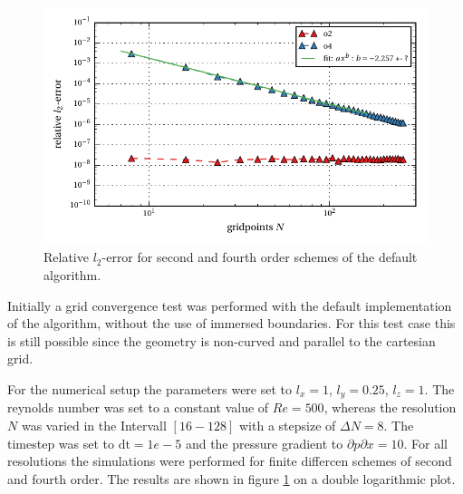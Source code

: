 \begin{figure}[!bp]
    \centering
    \includegraphics{gfx/immersed_boundary/poiseuille_flow/1_default/relative_l2error.pdf}
    \caption{Relative $l_2$-error for second and fourth order schemes of the default algorithm.\label{fig:ema1}}
\end{figure}

Initially a grid convergence test was performed with the default
 implementation of the algorithm, without the use of immersed boundaries.
For this test case this is still possible since the geometry is non-curved
 and parallel to the cartesian grid.

For the  numerical setup the parameters were set to $l_x=1$, $l_y=0.25$, $l_z=1$.
The reynolds number was set to a constant value of $Re=500$, whereas the resolution $N$
 was varied in the Intervall $[16 - 128]$ with a stepsize of $\Delta N = 8$.
The timestep was set to $\mathrm{dt}=1e-5$ and the pressure gradient to $\partial p \partial x  = 10$.
For all resolutions the simulations were performed for finite differcen
schemes of second and fourth order.
The results are shown in figure \ref{fig:ema1} on a double logarithmic plot.

